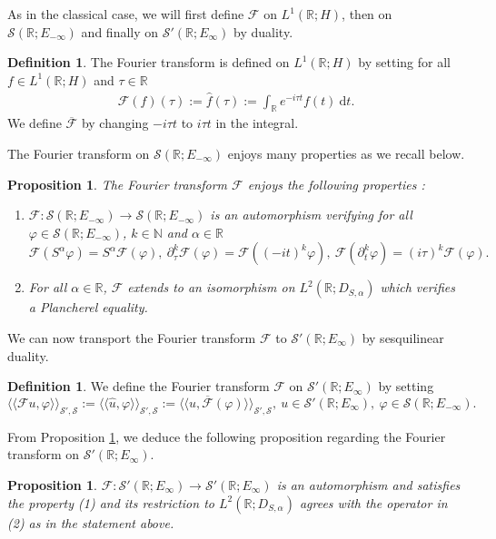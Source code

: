 \documentclass[11pt, letterpaper]{amsart}
\newtheorem{prop}[thm]{Proposition}
\theoremstyle{definition}
\newtheorem{defn}[thm]{Definition}
\theoremstyle{remark}
\newcommand{\llangle}{\langle\!\langle}
\newcommand{\rrangle}{\rangle\!\rangle}
\numberwithin{equation}{section}
\begin{document}
As in the classical case, we will first define $\mathcal{F}$ on $L^1(\mathbb{R};H)$, then on $\mathcal{S}(\mathbb{R};E_{-\infty})$ and finally on $\mathcal{S'}(\mathbb{R};E_\infty)$ by duality.
\begin{defn} The Fourier transform is defined on $L^1(\mathbb{R};H)$ by setting for all $f \in L^1(\mathbb{R};H)$ and $\tau \in \mathbb{R}$
\begin{align*}
    \mathcal{F}(f)(\tau):=\hat{f}(\tau):= \int_{\mathbb{R}} e^{-\textit{i}\tau t} f(t)  \ \mathrm{d}t.
\end{align*}
We define $\overline{\mathcal{F}}$ by changing $-i\tau t $ to $i\tau t$ in the integral.
\end{defn}
The Fourier transform on $\mathcal{S}(\mathbb{R};E_{-\infty})$ enjoys many properties as we recall below.

\begin{prop}
    \label{TFS} The Fourier transform $\mathcal{F}$ enjoys the following properties : 
\begin{enumerate}
    \item $\mathcal{F}: \mathcal{S}(\mathbb{R};E_{-\infty}) \rightarrow \mathcal{S}(\mathbb{R};E_{-\infty})$ is an automorphism verifying for all $\varphi \in \mathcal{S}(\mathbb{R};E_{-\infty})$, $k \in \mathbb{N}$ and $\alpha \in \mathbb{R}$ $$\mathcal{F}(S^\alpha \varphi )=S^\alpha \mathcal{F}(\varphi ), \ \partial_\tau^k \mathcal{F}(\varphi )=  \mathcal{F}((-\textit{i}t)^k\varphi), \ \mathcal{F}(\partial_t^k\varphi )= (\textit{i}\tau )^k  \mathcal{F}(\varphi ).$$
    \item For all $\alpha \in \mathbb{R}$, $\mathcal{F}$ extends to an isomorphism on $ L^2(\mathbb{R};D_{S,\alpha})$ which verifies a Plancherel equality.
\end{enumerate}
\end{prop}
We can now transport the Fourier transform $\mathcal{F}$ to $\mathcal{S'}(\mathbb{R};E_\infty)$ by sesquilinear duality.
 

\begin{defn}
We define the Fourier transform $\mathcal{F}$ on $\mathcal{S'}(\mathbb{R};E_\infty)$ by setting 
\begin{equation*}
    \llangle \mathcal{F}u,\varphi \rrangle_{\mathcal{S'},\mathcal{S}}:= \llangle \hat{u},\varphi \rrangle_{\mathcal{S'},\mathcal{S}} := \llangle u,\overline{\mathcal{F}}(\varphi) \rrangle_{\mathcal{S'},\mathcal{S}},\ u \in \mathcal{S'}(\mathbb{R};E_\infty), \ \varphi \in \mathcal{S}(\mathbb{R};E_{-\infty}).
\end{equation*}
\end{defn}
From Proposition \ref{TFS}, we deduce the following proposition regarding the Fourier transform on $\mathcal{S'}(\mathbb{R};E_\infty)$. 
\begin{prop}\label{TFS'}
     $\mathcal{F}: \mathcal{S'}(\mathbb{R};E_\infty) \rightarrow \mathcal{S'}(\mathbb{R};E_\infty)$ is an automorphism and satisfies the property (1) and its restriction to $ L^2(\mathbb{R};D_{S,\alpha})$ agrees with the operator in (2)  as in the statement above. 
\end{prop}
\end{document}
